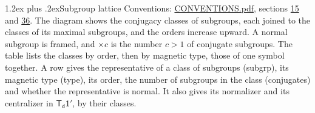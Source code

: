 \documentclass[10pt,a4paper]{article}
\makeatletter
\renewcommand\section{\@startsection{section}{1}{\z@}{-3ex plus -1ex minus -.2ex}%
  {1.2ex plus .2ex}{\normalfont\large\sffamily\bfseries\color{parttitle}}}
\numberwithin{equation}{section}
\newcommand{\grp}[1]{\mathsf{#1}}
\makeatother
\begin{document}
\section{Subgroup lattice}\label{s:subgroups}
Conventions: \href{../../CONVENTIONS.pdf}{CONVENTIONS.pdf}, sections \href{../../../rotation/CONVENTIONS.pdf\#conv.15}{15} and \href{../../CONVENTIONS.pdf\#conv.36}{36}.
The diagram shows the conjugacy classes of subgroups, each joined to the classes of its maximal subgroups, and the orders increase upward. \label{n:index.conjugates.c}\label{n:mark.conjugates}A normal subgroup is framed, and ${\times}c$ is the number $c > 1$ of conjugate subgroups. The table lists the classes by order, then by magnetic type, those of one symbol together. \label{n:head.subgroup}\label{n:head.magnetic.type}\label{n:head.order}\label{n:head.conjugates}\label{n:head.normal}A row gives the representative of a class of subgroups (subgrp), its magnetic type (type), its order, the number of subgroups in the class (conjugates) and whether the representative is normal. \label{n:head.normalizer}\label{n:head.centralizer}It also gives its normalizer and its centralizer in $\grp{T_{d}1'}$, by their classes. 
\end{document}
